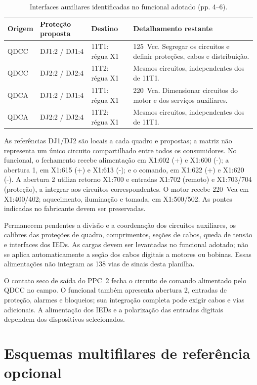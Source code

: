 \documentclass[11pt,a4paper]{article}
\begin{document}
\begin{table}[htbp]\centering\small
\caption{Interfaces auxiliares identificadas no funcional adotado (pp. 4--6).}
\begin{tabularx}{\linewidth}{@{}L{2.2cm}L{2.8cm}L{2.5cm}Y@{}}\toprule
Origem & Proteção proposta & Destino & Detalhamento restante \\\midrule
QDCC & DJ1:2 / DJ1:4 & 11T1: régua X1 & 125~Vcc. Segregar os circuitos e definir proteções, cabos e distribuição.\\
QDCC & DJ2:2 / DJ2:4 & 11T2: régua X1 & Mesmos circuitos, independentes dos de 11T1.\\
QDCA & DJ1:2 / DJ1:4 & 11T1: régua X1 & 220~Vca. Dimensionar circuitos do motor e dos serviços auxiliares.\\
QDCA & DJ2:2 / DJ2:4 & 11T2: régua X1 & Mesmos circuitos, independentes dos de 11T1.\\\bottomrule
\end{tabularx}\end{table}
As referências DJ1/DJ2 são locais a cada quadro e propostas; a matriz não
representa um único circuito compartilhado entre todos os consumidores.
No funcional, o fechamento recebe alimentação em X1:602 (+) e X1:600 (-);
a abertura 1, em X1:615 (+) e X1:613 (-); e o comando, em X1:622 (+) e
X1:620 (-). A abertura 2 utiliza retorno X1:700 e entradas X1:702 (remoto)
e X1:703/704 (proteção), a integrar aos circuitos correspondentes.
O motor recebe 220~Vca em X1:400/402; aquecimento, iluminação e tomada,
em X1:500/502. As pontes indicadas no fabricante devem ser preservadas.

Permanecem pendentes a divisão e a coordenação dos circuitos auxiliares,
os calibres das proteções de quadro, comprimentos, seções de cabos,
queda de tensão e interfaces dos IEDs. As cargas devem ser levantadas
no funcional adotado; não se aplica automaticamente a seção dos cabos
digitais a motores ou bobinas. Essas alimentações não integram as 138 vias
de sinais desta planilha.

O contato seco de saída do PPC~2 fecha o circuito de comando alimentado
pelo QDCC no campo. O funcional também apresenta abertura 2, entradas de
proteção, alarmes e bloqueios; sua integração completa pode exigir cabos
e vias adicionais. A alimentação dos IEDs e a polarização das entradas
digitais dependem dos dispositivos selecionados.

\clearpage
\section{Esquemas multifilares de referência opcional}
\label{sec:multifilar-mt}
\end{document}
